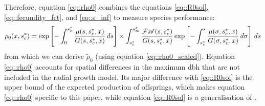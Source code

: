 Therefore, equation \eqref{eq::rho0} combines the equations \eqref{eq::R0sol}, \eqref{eq::fecundity_fct}, and \eqref{eq::s_inf} to measure species performance:
\begin{equation} \label{eq::rho0}
	\rho_0(x, {s}^{*}_c) = \exp \left[-\int_0^{{s}^{*}_c}\frac{\mu(s, {s}^{*}_c, x)}{G(s, {s}^{*}_c, x)} \, ds \right] \times \int_{{s}^{*}_c}^{s_{\infty}^{x}} \frac{\mathcal{F} \mathscr{A}(s, {s}^{*}_c)}{G(s, {s}^{*}_c, x)} \exp \left[-\int_{{s}^{*}_c}^{s} \frac{\mu(\sigma, {s}^{*}_c, x)}{G(\sigma, {s}^{*}_c, x)} \, d\sigma \right] \, ds
\end{equation}
from which we can derive $ \tilde \rho_0 $ (using equation \eqref{eq::rho0_scaled}). Equation \eqref{eq::rho0} accounts for spatial differences in the maximum dbh that are not included in the radial growth model. Its major difference with \eqref{eq::R0sol} is the upper bound of the expected production of offsprings, which makes equation \eqref{eq::rho0} specific to this paper, while equation \eqref{eq::R0sol} is a generalisation of \citet{Purves2009}.
